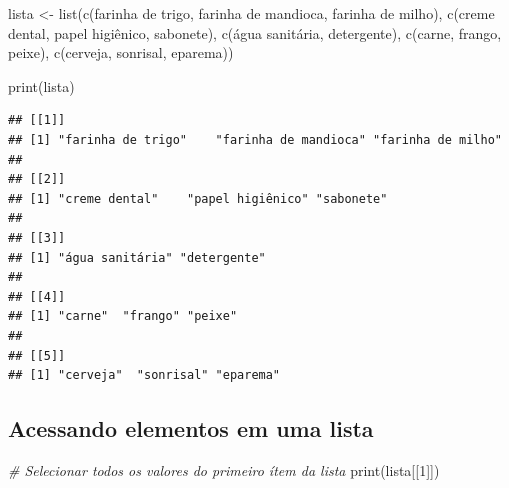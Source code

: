 \documentclass[
]{article}
\newenvironment{Shaded}{\begin{snugshade}}{\end{snugshade}}
\newcommand{\CommentTok}[1]{\textcolor[rgb]{0.56,0.35,0.01}{\textit{#1}}}
\newcommand{\DecValTok}[1]{\textcolor[rgb]{0.00,0.00,0.81}{#1}}
\newcommand{\FunctionTok}[1]{\textcolor[rgb]{0.00,0.00,0.00}{#1}}
\newcommand{\NormalTok}[1]{#1}
\newcommand{\OtherTok}[1]{\textcolor[rgb]{0.56,0.35,0.01}{#1}}
\newcommand{\StringTok}[1]{\textcolor[rgb]{0.31,0.60,0.02}{#1}}
\begin{document}
\begin{Shaded}
\begin{Highlighting}[]
\NormalTok{lista }\OtherTok{\textless{}{-}} \FunctionTok{list}\NormalTok{(}\FunctionTok{c}\NormalTok{(}\StringTok{\textquotesingle{}farinha de trigo\textquotesingle{}}\NormalTok{, }\StringTok{\textquotesingle{}farinha de mandioca\textquotesingle{}}\NormalTok{, }\StringTok{\textquotesingle{}farinha de milho\textquotesingle{}}\NormalTok{), }
              \FunctionTok{c}\NormalTok{(}\StringTok{\textquotesingle{}creme dental\textquotesingle{}}\NormalTok{, }\StringTok{\textquotesingle{}papel higiênico\textquotesingle{}}\NormalTok{, }\StringTok{\textquotesingle{}sabonete\textquotesingle{}}\NormalTok{),}
              \FunctionTok{c}\NormalTok{(}\StringTok{\textquotesingle{}água sanitária\textquotesingle{}}\NormalTok{, }\StringTok{\textquotesingle{}detergente\textquotesingle{}}\NormalTok{),}
              \FunctionTok{c}\NormalTok{(}\StringTok{\textquotesingle{}carne\textquotesingle{}}\NormalTok{, }\StringTok{\textquotesingle{}frango\textquotesingle{}}\NormalTok{, }\StringTok{\textquotesingle{}peixe\textquotesingle{}}\NormalTok{),}
              \FunctionTok{c}\NormalTok{(}\StringTok{\textquotesingle{}cerveja\textquotesingle{}}\NormalTok{, }\StringTok{\textquotesingle{}sonrisal\textquotesingle{}}\NormalTok{, }\StringTok{\textquotesingle{}eparema\textquotesingle{}}\NormalTok{))}

\FunctionTok{print}\NormalTok{(lista)}
\end{Highlighting}
\end{Shaded}

\begin{verbatim}
## [[1]]
## [1] "farinha de trigo"    "farinha de mandioca" "farinha de milho"   
## 
## [[2]]
## [1] "creme dental"    "papel higiênico" "sabonete"       
## 
## [[3]]
## [1] "água sanitária" "detergente"    
## 
## [[4]]
## [1] "carne"  "frango" "peixe" 
## 
## [[5]]
## [1] "cerveja"  "sonrisal" "eparema"
\end{verbatim}

\hypertarget{acessando-elementos-em-uma-lista}{%
\subsection{Acessando elementos em uma
lista}\label{acessando-elementos-em-uma-lista}}

\begin{Shaded}
\begin{Highlighting}[]
\CommentTok{\# Selecionar todos os valores do primeiro ítem da lista}
\FunctionTok{print}\NormalTok{(lista[[}\DecValTok{1}\NormalTok{]])}
\end{Highlighting}
\end{Shaded}
\end{document}
